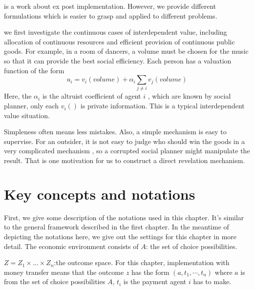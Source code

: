  \parencite{Ely2006} is a work about ex post implementation. However, we provide different formulations which is easier to grasp and applied to different problems.
 
 we first investigate the continuous
 cases of interdependent value,  including allocation of continuous resources and efficient provision of continuous public goods. 
 For example, in a room of dancers, a volume must be chosen for the music so that it can provide the best social efficiency. Each person
 has a valuation function of the form 
 $$u_i= v_i(volume) + \alpha_i\sum_{j\neq i}v_j(volume)$$
 Here, the $\alpha_i$ is the altruist coefficient of agent $i$ , which are known by social planner, only each $v_i()$ is private information. This is a typical interdependent value situation.
 


 
Simpleness often means less mistakes. Also, a simple mechanism is  easy to supervise. For an outsider, it is not easy to judge who should win the goods in a very complicated mechanism
, so a corrupted social planner might manipulate the result. That is one motivation for us to construct a direct revelation mechanism.





\section{Key concepts and notations}
First, we give some description of the notations used in this chapter. It's similar to the general framework described in the first chapter. In the meantime of depicting the notations here, we give out the settings for this 
chapter in more detail.
The economic environment consists of
$A$: the set of choice possibilities.

$Z=Z_1\times \dots\times Z_n$:the outcome space. For this chapter, implementation with money transfer means that the 
outcome $z$ has the form $(a, t_1,\cdots,t_n)$ where $a$ is from the set of choice possibilities $A$, $t_i$ is 
the payment agent $i$ has to make.

